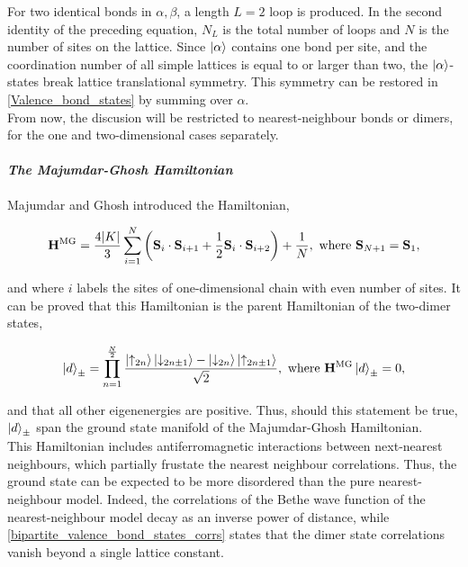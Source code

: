 \documentclass{homework}
\begin{document}
For two identical bonds in $\alpha, \beta$, a length $L = 2$ loop is produced. In the second identity of the preceding equation, $N_L$ is the total number of loops and $N$ is the number of sites on the lattice. Since $\ket{\alpha}$ contains one bond per site, and the coordination number of all simple lattices is equal to or larger than two, the $\ket{\alpha}$-states break lattice translational symmetry. This symmetry can be restored in \cref{Valence_bond_states} by summing over $\alpha$. \\

From now, the discusion will be restricted to nearest-neighbour bonds or dimers, for the one and two-dimensional cases separately. \\

\paragraph{\textit{The Majumdar-Ghosh Hamiltonian}}

Majumdar and Ghosh introduced the Hamiltonian,

\begin{equation}
    {\bf H}^{\textnormal{MG}} = \frac{4 |K|}{3} \sum_{i=1}^N \bigg({\bf S}_i \cdot {\bf S}_{i+1} + \frac{1}{2} {\bf S}_{i} \cdot {\bf S}_{i+2}\bigg) + \frac{1}{N}, \textnormal{ where } {\bf S}_{N+1} = {\bf S}_1,
\end{equation}

and where $i$ labels the sites of one-dimensional chain with even number of sites. It can be proved that this Hamiltonian is the parent Hamiltonian of the two-dimer states, 

\begin{equation}
    \ket{d}_{\pm} = \prod_{n=1}^{\frac{N}{2}} \frac{\ket{\uparrow_{2n}} \ket{\downarrow_{2n\pm1}} - \ket{\downarrow_{2n}} \ket{\uparrow_{2n \pm 1}}}{\sqrt{2}}, \textnormal{ where } {\bf H}^{\textnormal{MG}} \ket{d}_{\pm} = 0, 
    \label{dimer_states}
\end{equation}

and that all other eigenenergies are positive. Thus, should this statement be true, $\ket{d}_{\pm}$ span the ground state manifold of the Majumdar-Ghosh Hamiltonian. \\

This Hamiltonian includes antiferromagnetic interactions between next-nearest neighbours, which partially frustate the nearest neighbour correlations. Thus, the ground state can be expected to be more disordered than the pure nearest-neighbour model. Indeed, the correlations of the Bethe wave function of the nearest-neighbour model decay as an inverse power of distance, while  \cref{bipartite_valence_bond_states_corrs} states that the dimer state correlations vanish beyond a single lattice constant. 
\end{document}

